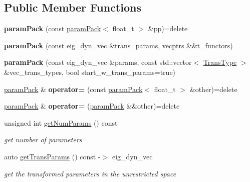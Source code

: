 \subsection*{Public Member Functions}
\begin{DoxyCompactItemize}
\item 
\mbox{\label{classparamPack_a1f2d0fd1a41fc3613720fea6970f3863}} 
{\bfseries param\+Pack} (const \hyperlink{classparamPack}{param\+Pack}$<$ float\+\_\+t $>$ \&pp)=delete
\item 
\mbox{\label{classparamPack_aa0604c18c4193d9fb1d2ebdbf4b13453}} 
{\bfseries param\+Pack} (const eig\+\_\+dyn\+\_\+vec \&trans\+\_\+params, vecptrs \&\&t\+\_\+functors)
\item 
\mbox{\label{classparamPack_a5b7435ceaba6ff09bb15c41a2e4c0ea8}} 
{\bfseries param\+Pack} (const eig\+\_\+dyn\+\_\+vec \&params, const std\+::vector$<$ \hyperlink{param__transforms_8h_acee593b112f4fc85f850631b9c6aaae9}{Trans\+Type} $>$ \&vec\+\_\+trans\+\_\+types, bool start\+\_\+w\+\_\+trans\+\_\+params=true)
\item 
\mbox{\label{classparamPack_a0915d75808a11dbee39426c5edb75011}} 
\hyperlink{classparamPack}{param\+Pack} \& {\bfseries operator=} (const \hyperlink{classparamPack}{param\+Pack}$<$ float\+\_\+t $>$ \&other)=delete
\item 
\mbox{\label{classparamPack_ab09197e05185ab2981c2b8e539eaaa35}} 
\hyperlink{classparamPack}{param\+Pack} \& {\bfseries operator=} (\hyperlink{classparamPack}{param\+Pack} \&\&other)=delete
\item 
unsigned int \hyperlink{classparamPack_ad9df1725f12d795a3abeddfca0485cda}{get\+Num\+Params} () const
\begin{DoxyCompactList}\small\item\em get number of parameters \end{DoxyCompactList}\item 
auto \hyperlink{classparamPack_ae389cdb81dea521ebe21d170c4c855f8}{get\+Trans\+Params} () const -\/$>$ eig\+\_\+dyn\+\_\+vec
\begin{DoxyCompactList}\small\item\em get the transformed parameters in the unrestricted space \end{DoxyCompactList}\item 

\end{DoxyCompactItemize}
